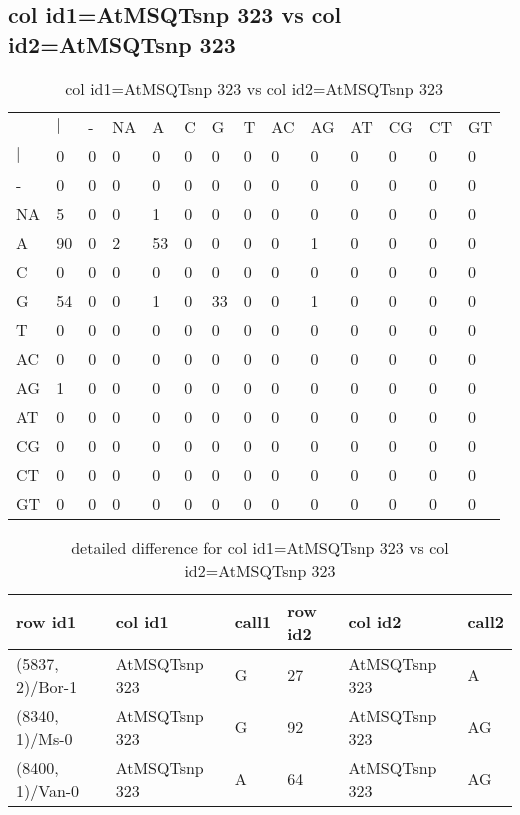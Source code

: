 \subsection{col id1=AtMSQTsnp 323 vs col id2=AtMSQTsnp 323}
\begin{center}
\begin{longtable}{|l|l|l|l|l|l|l|l|l|l|l|l|l|l|}
\caption{col id1=AtMSQTsnp 323 vs col id2=AtMSQTsnp 323} \label{table_dm656}\\
\hline
\\
\hline
&$|$&-&NA&A&C&G&T&AC&AG&AT&CG&CT&GT\\
$|$&0&0&0&0&0&0&0&0&0&0&0&0&0\\
-&0&0&0&0&0&0&0&0&0&0&0&0&0\\
NA&5&0&0&1&0&0&0&0&0&0&0&0&0\\
A&90&0&2&53&0&0&0&0&1&0&0&0&0\\
C&0&0&0&0&0&0&0&0&0&0&0&0&0\\
G&54&0&0&1&0&33&0&0&1&0&0&0&0\\
T&0&0&0&0&0&0&0&0&0&0&0&0&0\\
AC&0&0&0&0&0&0&0&0&0&0&0&0&0\\
AG&1&0&0&0&0&0&0&0&0&0&0&0&0\\
AT&0&0&0&0&0&0&0&0&0&0&0&0&0\\
CG&0&0&0&0&0&0&0&0&0&0&0&0&0\\
CT&0&0&0&0&0&0&0&0&0&0&0&0&0\\
GT&0&0&0&0&0&0&0&0&0&0&0&0&0\\
\hline
\end{longtable}
\end{center}

\begin{center}
\begin{longtable}{|l|l|l|l|l|l|}
\caption{detailed difference for col id1=AtMSQTsnp 323 vs col id2=AtMSQTsnp 323} \label{table_dm657}\\
\hline
row id1&col id1&call1&row id2&col id2&call2\\
\hline
(5837, 2)/Bor-1&AtMSQTsnp 323&G&27&AtMSQTsnp 323&A\\
(8340, 1)/Ms-0&AtMSQTsnp 323&G&92&AtMSQTsnp 323&AG\\
(8400, 1)/Van-0&AtMSQTsnp 323&A&64&AtMSQTsnp 323&AG\\
\hline
\end{longtable}
\end{center}

